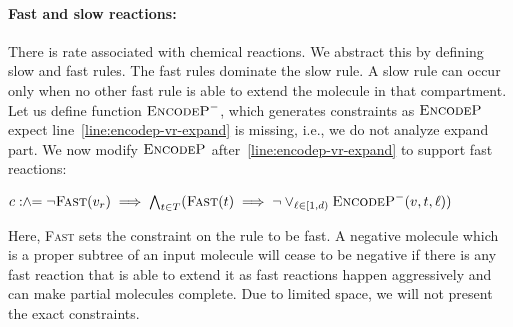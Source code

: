 \paragraph{Fast and slow reactions:}
There is rate associated with chemical reactions. We abstract this by defining slow and fast rules.
The fast rules dominate the slow rule.
A slow rule can occur only when no other fast rule is able to extend the molecule in that compartment.
Let us define function $\textsc{EncodeP}^-$, which generates constraints as $\textsc{EncodeP}$ expect
line~\ref{line:encodep-vr-expand} is missing, i.e., we do not analyze expand part.
We now modify $\textsc{EncodeP}$ after~\ref{line:encodep-vr-expand} to support fast reactions:\\
\begin{minipage}{1.0\linewidth}
\begin{algorithmic}[1]
  \State $c \mathrel{:\hspace{-3pt}\land\hspace{-3pt}=} \lnot \textsc{Fast}(v_r) \implies 
  \bigwedge_{t \in T} (\textsc{Fast}(t) \implies \lnot\lor_{ {\ell \in [1,d)}} \textsc{EncodeP}^-( v, t, \ell))$
\end{algorithmic}
\end{minipage}
Here, \textsc{Fast} sets the constraint on the rule to be fast.
A negative molecule which is a proper subtree of an input molecule will cease to be negative if there is any fast reaction that is able to extend it as fast reactions happen aggressively and can make partial molecules complete. Due to limited space, we will not present the exact constraints.


